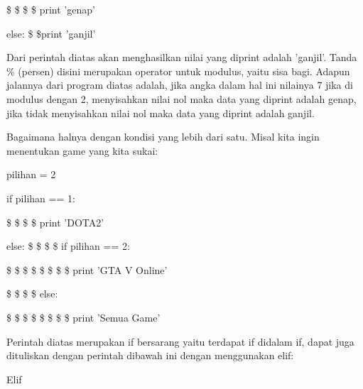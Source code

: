  \$  \$  \$  \$ print 'genap' \par
\noindent 
\vspace{\baselineskip}
else:\vspace{\baselineskip}
 \$  \$print 'ganjil' \par
\noindent 
\vspace{\baselineskip}
 Dari perintah diatas akan menghasilkan nilai yang diprint adalah 'ganjil'. Tanda  $  \%  $ (persen) disini merupakan operator untuk modulus, yaitu sisa bagi. Adapun jalannya dari program diatas adalah, jika angka dalam hal ini nilainya 7 jika di modulus dengan 2, menyisahkan nilai nol maka data yang diprint adalah genap, jika tidak menyisahkan nilai nol maka data yang diprint adalah ganjil. \par
\noindent 
\vspace{\baselineskip}
Bagaimana halnya dengan kondisi yang lebih dari satu. Misal kita ingin menentukan game yang kita sukai: \par
\noindent 
\vspace{\baselineskip}
pilihan = 2 \par
\noindent 
\vspace{\baselineskip}
if pilihan == 1: \par
\noindent 
\vspace{\baselineskip}
 \$  \$  \$  \$ print 'DOTA2' \par
\noindent 
\vspace{\baselineskip}
else:\vspace{\baselineskip}
 \$  \$  \$  \$ if pilihan == 2: \par
\noindent 
\vspace{\baselineskip}
 \$  \$  \$  \$  \$  \$  \$  \$ print 'GTA V Online' \par
\noindent 
\vspace{\baselineskip}
 \$  \$  \$  \$ else: \par
\noindent 
\vspace{\baselineskip}
 \$  \$  \$  \$  \$  \$  \$  \$ print 'Semua Game' \par
\noindent 
\vspace{\baselineskip}
Perintah diatas merupakan if bersarang yaitu terdapat if didalam if, dapat juga dituliskan dengan perintah dibawah ini dengan menggunakan elif: \par
\noindent 
\vspace{\baselineskip}
\vspace{\baselineskip}
Elif \par
\noindent 
